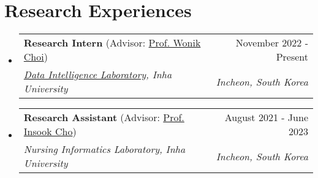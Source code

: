\documentclass[letterpaper,11pt]{article}
\makeatletter
\newcommand{\resumeSubheading}[4]{
  \vspace{-1pt}\item
    \begin{tabular*}{0.97\textwidth}{l@{\extracolsep{\fill}}r}
      #1 & #2 \\
      \textit{\small#3} & \textit{\small #4} \\
    \end{tabular*}\vspace{-5pt}
}
\makeatother
\begin{document}
    \section{Research Experiences}
    \begin{itemize}[leftmargin=*,label=]
        \resumeSubheading
        {\textbf{Research Intern} (Advisor: \href{http://bit.ly/3zSrQ8F}{Prof. Wonik Choi})}{November 2022 - Present}
            {\href{http://dilab.inha.ac.kr/}{Data Intelligence Laboratory}, Inha University}{Incheon, South Korea}
        \resumeSubheading
        {\textbf{Research Assistant} (Advisor: \href{http://bit.ly/412nYOw}{Prof. Insook Cho})}{August 2021 - June 2023}
            {Nursing Informatics Laboratory, Inha University}{Incheon, South Korea}
    \end{itemize}
    
\end{document}
